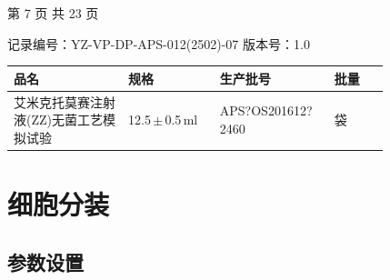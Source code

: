 \documentclass[UTF8,10pt,a4paper,fontset=fandol]{ctexart}
\newcommand{\fieldvalue}[1]{#1}
\newcommand{\handwritten}[1]{#1}
\begin{document}
\vfill

\begin{center}
第 7 页 共 23 页
\end{center}

\newpage

\begin{center}
记录编号：YZ-VP-DP-APS-012(2502)-07 \quad 版本号：1.0
\end{center}

\begin{tabular}{|p{0.25\linewidth}|p{0.20\linewidth}|p{0.25\linewidth}|p{0.12\linewidth}|}
\hline
品名 & 规格 & 生产批号 & 批量\\
\hline
\fieldvalue{艾米克托莫赛注射液(ZZ)无菌工艺模拟试验}
&
\fieldvalue{12.5\,$\pm$\,0.5\,ml}
&
\fieldvalue{\handwritten{APS?OS201612?2460}}
&
袋\\
\hline
\end{tabular}

\section{细胞分装}

\subsection{参数设置}
\end{document}
